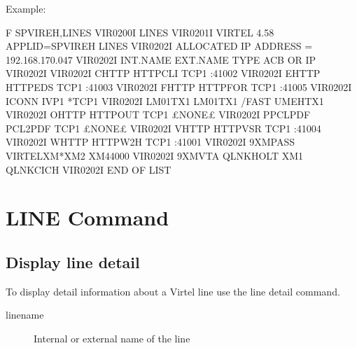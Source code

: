 \documentclass[letterpaper,10pt,english]{sphinxmanual}
\begin{document}
Example:

\begin{sphinxVerbatim}[commandchars=\\\{\}]
F SPVIREH,LINES
VIR0200I LINES
VIR0201I VIRTEL 4.58 APPLID=SPVIREH  LINES
VIR0202I ALLOCATED IP ADDRESS = 192.168.170.047
VIR0202I INT.NAME EXT.NAME TYPE  ACB OR IP
VIR0202I \PYGZhy{}\PYGZhy{}\PYGZhy{}\PYGZhy{}\PYGZhy{}\PYGZhy{}\PYGZhy{}\PYGZhy{} \PYGZhy{}\PYGZhy{}\PYGZhy{}\PYGZhy{}\PYGZhy{}\PYGZhy{}\PYGZhy{}\PYGZhy{} \PYGZhy{}\PYGZhy{}\PYGZhy{}\PYGZhy{}\PYGZhy{} \PYGZhy{}\PYGZhy{}\PYGZhy{}\PYGZhy{}\PYGZhy{}\PYGZhy{}\PYGZhy{}\PYGZhy{}\PYGZhy{}
VIR0202I C\PYGZhy{}HTTP   HTTP\PYGZhy{}CLI TCP1  :41002
VIR0202I E\PYGZhy{}HTTP   HTTP\PYGZhy{}EDS TCP1  :41003
VIR0202I F\PYGZhy{}HTTP   HTTP\PYGZhy{}FOR TCP1  :41005
VIR0202I I\PYGZhy{}CONN   IVP1    *TCP1
VIR0202I LM01TX1  LM01TX1  /FAST UMEHTX1
VIR0202I O\PYGZhy{}HTTP   HTTP\PYGZhy{}OUT TCP1  £NONE£
VIR0202I P\PYGZhy{}PCLPDF PCL2PDF  TCP1  £NONE£
VIR0202I V\PYGZhy{}HTTP   HTTP\PYGZhy{}VSR TCP1  :41004
VIR0202I W\PYGZhy{}HTTP   HTTP\PYGZhy{}W2H TCP1  :41001
VIR0202I 9\PYGZhy{}XMPASS VIRTELXM*XM2   XM44000
VIR0202I 9\PYGZhy{}XMVTA  QLNKHOLT XM1   QLNKCICH
VIR0202I \PYGZhy{}\PYGZhy{}\PYGZhy{}END OF LIST\PYGZhy{}\PYGZhy{}\PYGZhy{}
\end{sphinxVerbatim}

\ignorespaces 

\section{LINE Command}
\label{\detokenize{audit_operations_ and_performance:line-command}}\label{\detokenize{audit_operations_ and_performance:index-5}}

\subsection{Display line detail}
\label{\detokenize{audit_operations_ and_performance:display-line-detail}}
To display detail information about a Virtel line use the line detail command.

\begin{sphinxVerbatim}[commandchars=\\\{\}]
  
\end{sphinxVerbatim}
\begin{description}
\item[{linename}] \leavevmode
Internal or external name of the line

\end{description}
\end{document}

